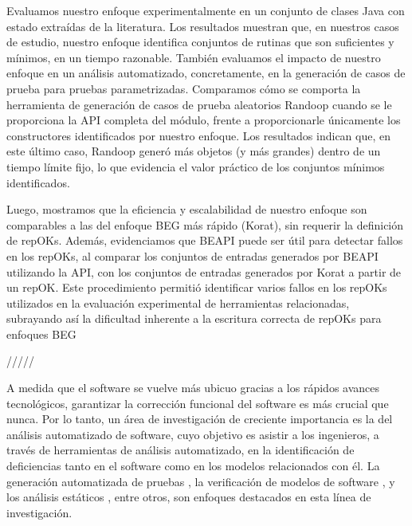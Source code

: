 Evaluamos nuestro enfoque experimentalmente en un conjunto de clases Java con estado extraídas de la literatura. Los resultados muestran que, en nuestros casos de estudio, nuestro enfoque identifica conjuntos de rutinas que son suficientes y mínimos, en un tiempo razonable. También evaluamos el impacto de nuestro enfoque en un análisis automatizado, concretamente, en la generación de casos de prueba para pruebas parametrizadas. Comparamos cómo se comporta la herramienta de generación de casos de prueba aleatorios Randoop cuando se le proporciona la API completa del módulo, frente a proporcionarle únicamente los constructores identificados por nuestro enfoque. Los resultados indican que, en este último caso, Randoop generó más objetos (y más grandes) dentro de un tiempo límite fijo, lo que evidencia el valor práctico de los conjuntos mínimos identificados.

Luego, mostramos que la eficiencia y escalabilidad de nuestro enfoque son comparables a las del enfoque BEG más rápido (Korat), sin requerir la definición de repOKs. Además, evidenciamos que BEAPI puede ser útil para detectar fallos en los repOKs, al comparar los conjuntos de entradas generados por BEAPI utilizando la API, con los conjuntos de entradas generados por Korat a partir de un repOK. Este procedimiento permitió identificar varios fallos en los repOKs utilizados en la evaluación experimental de herramientas relacionadas, subrayando así la dificultad inherente a la escritura correcta de repOKs para enfoques BEG




/////



A medida que el software se vuelve más ubicuo gracias a los rápidos avances tecnológicos, garantizar la corrección funcional del software es más crucial que nunca. Por lo tanto, un área de investigación de creciente importancia es la del análisis automatizado de software, cuyo objetivo es asistir a los ingenieros, a través de herramientas de análisis automatizado, en la identificación de deficiencias tanto en el software como en los modelos relacionados con él. La generación automatizada de pruebas \cite{Ponzio:2016, Rosner15, Abad13, Galeotti:2010, Khalek:2011, Pasareanu:2010, Gligoric10, Tillmann:2008, Pacheco07}, la verificación de modelos de software \cite{Visser06, Visser05, Clarke:2004}, y los análisis estáticos \cite{Calcagno:2011, Itzhaky:2014}, entre otros, son enfoques destacados en esta línea de investigación.

